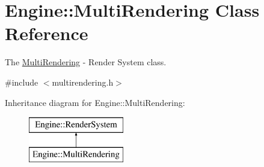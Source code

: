 \hypertarget{classEngine_1_1MultiRendering}{}\section{Engine\+:\+:Multi\+Rendering Class Reference}
\label{classEngine_1_1MultiRendering}


The \hyperlink{classEngine_1_1MultiRendering}{Multi\+Rendering} -\/ Render System class.  




{\ttfamily \#include $<$multirendering.\+h$>$}

Inheritance diagram for Engine\+:\+:Multi\+Rendering\+:\begin{figure}[H]
\begin{center}
\leavevmode
\includegraphics[height=2.000000cm]{classEngine_1_1MultiRendering}
\end{center}
\end{figure}
